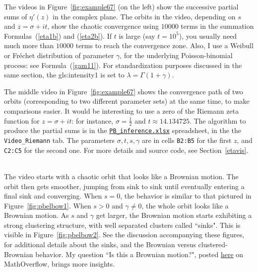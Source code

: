 \documentclass[10pt]{article}
\begin{document}
The videos in Figure~\ref{fig:example67} (on the left) show the successive partial sums of $\eta'(z)$ in the complex plane. The orbits in the video, depending on $s$ and $z=\sigma + it$, show the chaotic convergence using $\num{10000}$ terms in the summation Formulas~(\ref{eta1b}) and (\ref{eta2b}). If $t$ is large (say $t=10^5$), you usually need much more than $\num{10000}$ terms to reach the convergence zone. Also, I use a \textcolor{index}{Weibull} 
or \textcolor{index}{Fréchet}
distribution of parameter $\gamma$, for the underlying Poisson-binomial process: see
 Formula~(\ref{gam11}).  For standardization purposes discussed in the same section, the \gls{gls:intensity1} is set to $\lambda=\Gamma(1+\gamma)$. 

The middle video in Figure~\ref{fig:example67} shows the convergence path of  two orbits (corresponding to two different parameter sets) at the same time, to make comparisons easier. It would be interesting to use a zero of the Riemann zeta function for $z=\sigma+it$: for instance,
$\sigma=\frac{1}{2}$ and $t\approx 14.134725$. The algorithm to produce the partial sums is in the 
\href{https://github.com/VincentGranville/Point-Processes/tree/main/Spreadsheets}{\texttt{PB\_inference.xlsx}} spreadsheet, in the the \texttt{Video\_Riemann} tab. The parameters $\sigma,t,s,\gamma$ are in cells 
\texttt{B2:B5} for the
first $z$, and \texttt{C2:C5} for the second one. For more details and source code, see Section~\ref{etavis}.\\
 \quad \\

\noindent The video starts with a chaotic orbit that looks like a \textcolor{index}{Brownian motion}. The orbit then gets smoother, jumping from sink to sink until eventually entering a final sink and converging. When $s=0$, the behavior is similar to that pictured in Figure~\ref{fig:pbelbow1}. When $s>0$ and $\gamma\neq 0$,
the whole orbit looks like a Brownian motion. As $s$ and $\gamma$ get larger, the Brownian motion starts exhibiting a strong clustering structure, with well separated clusters called ``sinks".  This is visible in Figure~\ref{fig:pbelbow2}. See the discussion accompanying these figures, for additional details about the sinks, and the Brownian versus clustered-Brownian behavior. My question ``Is this a Brownian motion?", posted 
\href{https://mathoverflow.net/questions/414938/is-this-a-brownian-motion}{here} on MathOverflow, brings more insights.
\end{document}
